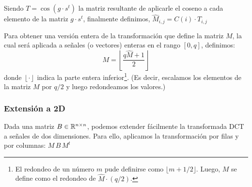 Siendo $T=\cos(g\cdot s^t)$ la matriz resultante de aplicarle el coseno a cada elemento de la matriz $g\cdot s^t$,
finalmente definimos, $\widehat{M}_{i,j} = C(i) \cdot T_{i,j}$

Para obtener una versi\'on entera de la transformaci\'on que define la matriz $M$, la cual ser\'a aplicada a se\~nales (o vectores) enteras en el rango $[0,q]$, definimos:
\begin{equation}
M = \left\lfloor \frac{q \widehat{M} + 1}{2}  \right\rfloor \label{eq:dctint}
\end{equation} 
donde $\left\lfloor\cdot\right\rfloor$ indica la parte entera inferior\footnote{El redondeo de un n\'umero $m$ pude definirse como $\lfloor m + 1/2 \rfloor$. Luego, $M$ se define como el redondeo de $\widehat{M}\cdot(q/2)$.}. (Es decir, escalamos los elementos de la matriz $M$ por $q/2$ y luego redondeamos los valores.)

\subsubsection{Extensi\'on a 2D}\label{sec:dct2d}
Dada una matriz $B\in\mathbb{R}^{n\times n}$, podemos extender f\'acilmente la transformada DCT a se\~nales de dos dimensiones. Para ello, aplicamos la transformaci\'on por filas y por columnas: $ M\, B\, M^t $

